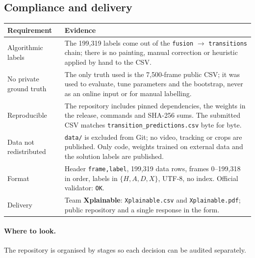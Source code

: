 \documentclass[10pt,a4paper]{article}
\begin{document}
\subsection*{Compliance and delivery}

\begin{center}
\footnotesize
\begin{tabularx}{\textwidth}{@{}>{\raggedright\arraybackslash}p{3.9cm}X@{}}
\toprule
Requirement & Evidence \\
\midrule
Algorithmic labels & The 199,319 labels come out of the
\texttt{fusion} $\to$ \texttt{transitions} chain; there is no painting, manual correction or
heuristic applied by hand to the CSV. \\
No private ground truth & The only truth used is the 7,500-frame public CSV; it was used to
evaluate, tune parameters and the bootstrap, never as an online input or for manual
labelling. \\
Reproducible & The repository includes pinned dependencies, the weights in the release,
commands and SHA-256 sums. The submitted CSV matches \texttt{transition\_predictions.csv}
byte for byte. \\
Data not redistributed & \texttt{data/} is excluded from Git; no video, tracking or crops
are published. Only code, weights trained on external data and the solution labels are
published. \\
Format & Header \texttt{frame,label}, 199,319 data rows, frames 0--199,318 in order, labels
in $\{H,A,D,X\}$, UTF-8, no index. Official validator: \texttt{OK}. \\
Delivery & Team \textbf{Xplainable}: \texttt{Xplainable.csv} and \texttt{Xplainable.pdf};
public repository and a single response in the form. \\
\bottomrule
\end{tabularx}
\end{center}

\paragraph{Where to look.}
The repository is organised by stages so each decision can be audited separately.
\end{document}

